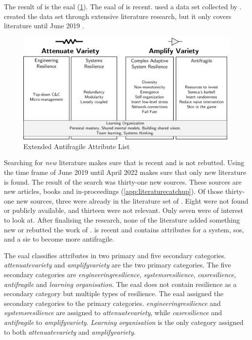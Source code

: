 The result of \citeauthor{Botjes2021} is the \acrfull{eaal} (\cref{fig:eaalbw}). The \acrfull{eaal} of \citeauthor{Botjes2021} is recent. \citeauthor{Botjes2021} used a data set collected by \textcite{Botjes2020}. \citeauthor{Botjes2020} created the data set through extensive literature research, but it only covers literature until June 2019 \parencite[p.~5]{Botjes2021}. 
\begin{figure}[H]
	\centering
	\includegraphics[width=0.8\linewidth]{images/eaalbw}
	\caption[Extended Antifragile Attribute List \parencite{Botjes2021}]{Extended Antifragile Attribute List \Parencite{Botjes2021}}
	\label{fig:eaalbw}
\end{figure}
Searching for \textit{new} literature makes sure that \textcite{Botjes2021} is recent and is not rebutted. Using the time frame of June 2019 until April 2022 makes sure that only new literature is found. The result of the search was thirty-one new sources. These sources are new articles, books and in-proceedings (\cref{app:literaturecatchup}). Of those thirty-one new sources, three were already in the literature set of \textcite{Botjes2020}. Eight were not found or publicly available, and thirteen were not relevant. Only seven were of interest to look at. After finalising the research, none of the literature added something new or rebutted the work of \citeauthor{Botjes2020}. \textcite{Botjes2021} is recent and contains \glspl{attribute} for a system, \gls{sos}, and a \gls{sie} to become more \gls{antifragile}.

The \acrlong{eaal} classifies \glspl{attribute} in two primary and five secondary categories. \textit{\Gls{attenuatevariety}} and \textit{\gls{amplifyvariety}} are the two primary categories. The five secondary categories are \textit{\gls{engineeringresilience}}, \textit{\gls{systemsresilience}}, \textit{\gls{casresilience}}, \textit{\gls{antifragile}} and \textit{learning organisation}. The \acrlong{eaal} does not contain resilience as a secondary category but multiple types of resilience. The \acrlong{eaal} assigned the secondary categories to the primary categories. \textit{\Gls{engineeringresilience}} and \textit{\gls{systemsresilience}} are assigned to \textit{\gls{attenuatevariety}}, while \textit{\gls{casresilience}} and \textit{\gls{antifragile}} to \textit{\gls{amplifyvariety}}. \textit{Learning organisation} is the only category assigned to both \textit{\gls{attenuatevariety}} and \textit{\gls{amplifyvariety}}.
